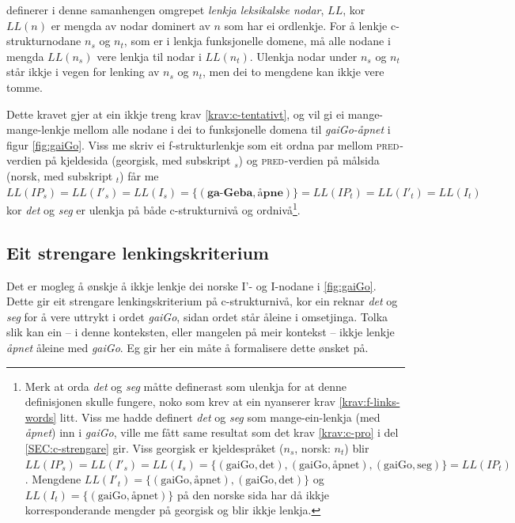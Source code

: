 \documentclass[12pt,a4paper,oneside,draft]{report}
\newcommand{\F}[2]{\textsc{#1}\ensuremath{_{#2}}}
\newcommand{\PRED}{\F{pred}{}}
\begin{document}
\citet[s.~77]{dyvik2009lmp} definerer i denne samanhengen omgrepet
 \emph{lenkja leksikalske nodar}, $LL$, kor $LL(n)$ er mengda av nodar
 dominert av $n$ som har ei ordlenkje. For å lenkje
 c\hyp{}strukturnodane $n_s$ og $n_t$, som er i lenkja funksjonelle
 domene, må alle nodane i mengda $LL(n_s)$ vere lenkja til nodar i
 $LL(n_t)$. Ulenkja nodar under $n_s$ og $n_t$ står ikkje i vegen for
 lenking av $n_s$ og $n_t$, men dei to mengdene kan ikkje vere tomme.

Dette kravet gjer at ein ikkje treng krav \ref{krav:c-tentativt}, og
 vil gi ei mange-mange-lenkje mellom alle nodane i dei to funksjonelle
 domena til \emph{gaiGo-åpnet} i figur \ref{fig:gaiGo}. Viss me skriv ei
 f\hyp{}strukturlenkje som eit ordna par mellom \PRED{}-verdien på
 kjeldesida (georgisk, med subskript $_s$) og \PRED{}-verdien på
 målsida (norsk, med subskript $_t$) får me
 $LL(IP_s)=LL(I'_s)=LL(I_s)=\{(\textbf{ga-Geba},\textbf{åpne})\}=LL(IP_t)=LL(I'_t)=LL(I_t)$
 kor \emph{det} og \emph{seg} er ulenkja på både c\hyp{}strukturnivå og
 ordnivå\footnote{\label{fn:LL-ordlenkje} Merk at orda \emph{det} og \emph{seg} måtte definerast som ulenkja for
        at denne definisjonen skulle fungere, noko som krev at ein nyanserer
        krav \ref{krav:f-links-words} litt. Viss me hadde definert
        \emph{det} og \emph{seg} som mange-ein-lenkja (med \emph{åpnet}) inn i
        \emph{gaiGo}, ville me fått same resultat som det krav
        \ref{krav:c-pro} i del \ref{SEC:c-strengare} gir.
        Viss georgisk er kjeldespråket
        ($n_s$, norsk: $n_t$) blir
        $LL(IP_s)=LL(I'_s)=LL(I_s)=\{(\text{gaiGo},\text{det}),(\text{gaiGo},\text{åpnet}),(\text{gaiGo},\text{seg})\}=LL(IP_t)$.
        Mengdene
        $LL(I'_t)=\{(\text{gaiGo},\text{åpnet}),(\text{gaiGo},\text{det})\}$
        og $LL(I_t)=\{(\text{gaiGo},\text{åpnet})\}$ på den norske
        sida har då ikkje korresponderande mengder på georgisk og blir
        ikkje lenkja. }.

\subsection{Eit strengare lenkingskriterium}
\label{sec-3.7.2}

\label{SEC:c-strengare}

Det er mogleg å ønskje å ikkje lenkje dei norske I'- og I-nodane i
 \ref{fig:gaiGo}. Dette gir eit strengare lenkingskriterium på
 c\hyp{}strukturnivå, kor ein reknar \emph{det} og \emph{seg} for å vere uttrykt
 i ordet \emph{gaiGo}, sidan ordet står åleine i omsetjinga. Tolka slik kan
 ein -- i denne konteksten, eller mangelen på meir kontekst -- ikkje
 lenkje \emph{åpnet} åleine med \emph{gaiGo}. Eg gir her ein måte å formalisere
 dette ønsket på.
\end{document}
